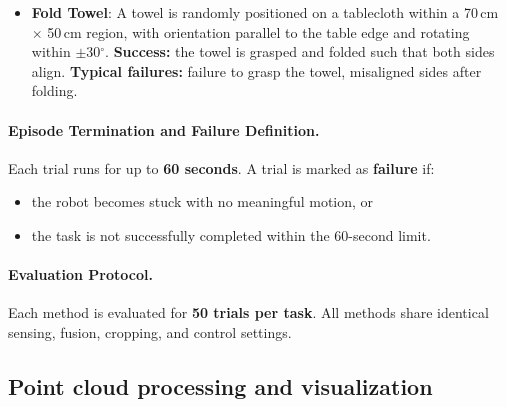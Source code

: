\documentclass[runningheads]{llncs}
\begin{document}
\begin{itemize}
    \item \textbf{Fold Towel}: A towel is randomly positioned on a tablecloth within a 70\,cm $\times$ 50\,cm region, with orientation parallel to the table edge and rotating within $\pm$30$^\circ$. \textbf{Success:} the towel is grasped and folded such that both sides align. \textbf{Typical failures:} failure to grasp the towel, misaligned sides after folding.
\end{itemize}

\paragraph{Episode Termination and Failure Definition.}
Each trial runs for up to \textbf{60 seconds}. A trial is marked as \textbf{failure} if:
\begin{itemize}
    \item the robot becomes stuck with no meaningful motion, or    
    \item the task is not successfully completed within the 60-second limit.
\end{itemize}



\paragraph{Evaluation Protocol.}
Each method is evaluated for \textbf{50 trials per task}.
All methods share identical sensing, fusion, cropping, and control settings.

\subsection{Point cloud processing and visualization}
\label{sec:realworld_all}
\end{document}
